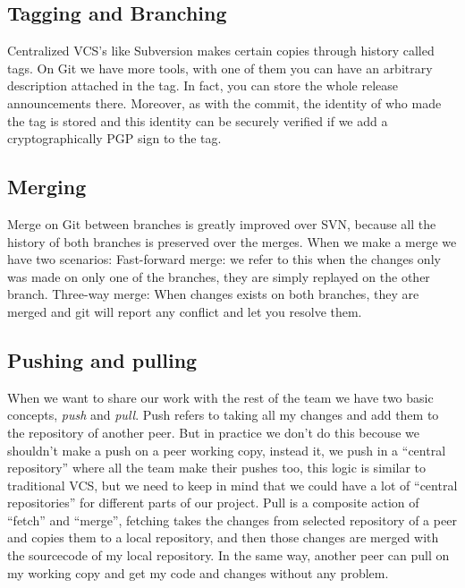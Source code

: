 \documentclass[%
	final,
	notitlepage,
	narroweqnarray,
	inline,
	twoside,
	]{ieee}
\begin{document}

\subsection{Tagging and Branching}


Centralized VCS's like Subversion makes certain copies through history called tags. 
On Git we have more tools, with one of them you can have an arbitrary 
description attached in the tag. In fact, you can store the whole release announcements there. 
Moreover, as with the commit, the identity of who made the tag is stored and this identity 
can be securely verified if we add a cryptographically PGP sign to the tag.

\subsection{Merging}

Merge on Git between branches is greatly improved over SVN, because all the history of 
both branches is preserved over the merges.
When we make a merge we have two scenarios:
Fast-forward merge: we refer to this when the changes only was made on only one of the branches,
they are simply replayed on the other branch.
Three-way merge: When changes exists on both branches, they are merged and git will report any 
conflict and let you resolve them. 


\subsection{Pushing and pulling}

When we want to share our work with the rest of the team we have two basic concepts, 
\emph{push} and \emph{pull}.
Push refers to taking all my changes and add them to the repository of another peer. 
But in practice we don't do this becouse we shouldn't make a push on a peer working copy, 
instead it, we push in a ``central repository'' where all the team make their pushes too, 
this logic is similar to traditional VCS, but we need to keep in mind that we could have a 
lot of ``central repositories'' for different parts of our project.
Pull is a composite action of ``fetch'' and ``merge'', fetching takes the changes from selected 
repository of a peer and copies them to a local repository, and 
then those changes are merged with the sourcecode of my local repository.
In the same way, another peer can pull on my working copy and get my code and 
changes without any problem.
\end{document}
